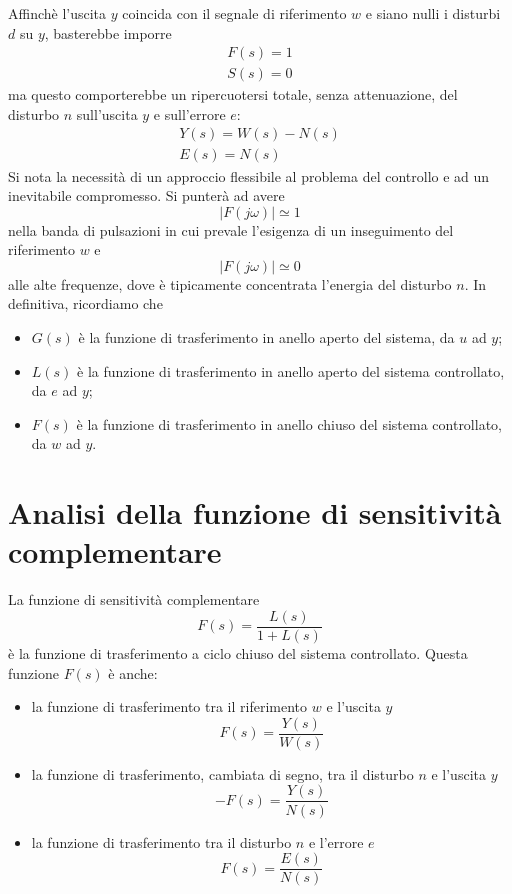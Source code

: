 \documentclass[a4paper]{report}
\begin{document}
Affinch\`e l'uscita $y$ coincida con il segnale di riferimento $w$ e
siano nulli i disturbi $d$ su $y$, basterebbe imporre
\[
\begin{array}{l}
  F(s) = 1\\
  S(s) = 0
\end{array}
\]
ma questo comporterebbe un ripercuotersi totale, senza attenuazione,
del disturbo $n$ sull'uscita $y$ e sull'errore $e$:
\[
\begin{array}{l}
  Y(s) = W(s) - N(s)\\
  E(s) = N(s)
\end{array}
\]
Si nota la necessit\`a di un approccio flessibile al problema del
controllo e ad un inevitabile compromesso. Si punter\`a ad avere
\[
|F(j \omega)| \simeq 1
\]
nella banda di pulsazioni in cui prevale l'esigenza di un inseguimento
del riferimento $w$ e
\[
|F(j \omega)| \simeq 0
\]
alle alte frequenze, dove \`e tipicamente concentrata l'energia del
disturbo $n$. In definitiva, ricordiamo che
\begin{itemize}
\item $G(s)$ \`e la funzione di trasferimento in anello aperto del
  sistema, da $u$ ad $y$;
\item $L(s)$ \`e la funzione di trasferimento in anello aperto del
  sistema controllato, da $e$ ad $y$;
\item $F(s)$ \`e la funzione di trasferimento in anello chiuso del
  sistema controllato, da $w$ ad $y$.
\end{itemize}

\section{Analisi della funzione di sensitivit\`a complementare}
La funzione di sensitivit\`a complementare
\[
F(s) = \dfrac{L(s)}{1 + L(s)}
\]
\`e la funzione di trasferimento a ciclo chiuso del sistema
controllato. Questa funzione $F(s)$ \`e anche:
\begin{itemize}
\item la funzione di trasferimento tra il riferimento $w$ e
  l'uscita $y$
  \[
  F(s) = \dfrac{Y(s)}{W(s)}
  \]
\item la funzione di trasferimento, cambiata di segno, tra il disturbo
  $n$ e l'uscita $y$
  \[
  - F(s) = \dfrac{Y(s)}{N(s)}
  \]
\item la funzione di trasferimento tra il disturbo $n$ e l'errore $e$
  \[
  F(s) = \dfrac{E(s)}{N(s)}
  \]
\end{itemize}
\end{document}
